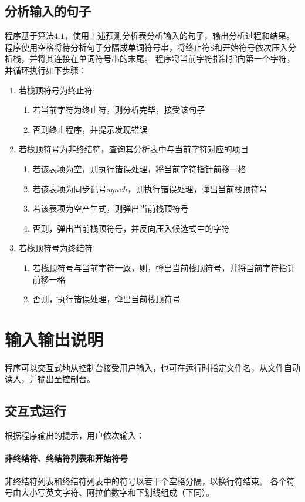 \documentclass[UTF8]{ctexart}
\begin{document}
\subsection{分析输入的句子}
程序基于算法$4.1$，使用上述预测分析表分析输入的句子，输出分析过程和结果。
程序使用空格将待分析句子分隔成单词符号串，将终止符$\$$和开始符号依次压入分析栈，并将其连接在单词符号串的末尾。
程序将当前字符指针指向第一个字符，并循环执行如下步骤：
\begin{enumerate}
	\item 若栈顶符号为终止符
    \begin{enumerate}
        \item 若当前字符为终止符，则分析完毕，接受该句子
        \item 否则终止程序，并提示发现错误
    \end{enumerate}
	\item 若栈顶符号为非终结符，查询其分析表中与当前字符对应的项目
	      \begin{enumerate}
		      \item 若该表项为空，则执行错误处理，将当前字符指针前移一格
		      \item 若该表项为同步记号$synch$，则执行错误处理，弹出当前栈顶符号
		      \item 若该表项为空产生式，则弹出当前栈顶符号
		      \item 否则，弹出当前栈顶符号，并反向压入候选式中的字符
	      \end{enumerate}
    \item 若栈顶符号为终结符
        \begin{enumerate}
            \item 若栈顶符号与当前字符一致，则，弹出当前栈顶符号，并将当前字符指针前移一格
            \item 否则，执行错误处理，弹出当前栈顶符号
        \end{enumerate}
    \end{enumerate}
\section{输入输出说明}
程序可以交互式地从控制台接受用户输入，也可在运行时指定文件名，从文件自动读入，并输出至控制台。
\subsection{交互式运行}
根据程序输出的提示，用户依次输入：
\paragraph{非终结符、终结符列表和开始符号}
非终结符列表和终结符列表中的符号以若干个空格分隔，以换行符结束。
各个符号由大小写英文字符、阿拉伯数字和下划线组成（下同）。
\end{document}
